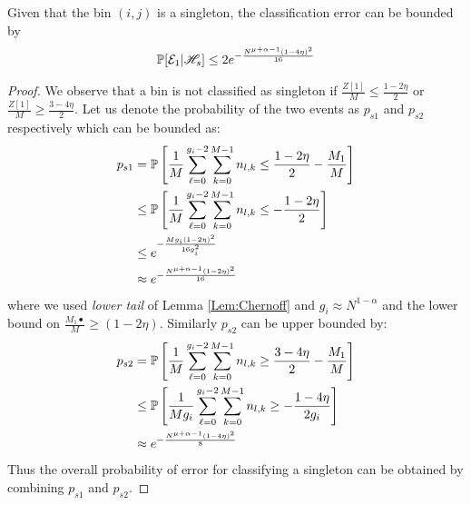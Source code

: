 \begin{lemma}[singleton]
\label{Lem:SingletonClassif}
Given that the bin $(i,j)$ is a singleton, the classification error can be bounded by
\begin{align*}
\mathbb{P}[\mathcal{E}_1|\mathscr{H}_s]\leq 2e^{-\frac{N^{\mu+\alpha-1}(1-4\eta)^2}{16}}
\end{align*}
\end{lemma}
\begin{proof}
We observe that a bin is not classified as singleton if $\frac{Z[1]}{M}\leq\frac{1-2\eta}{2}$ or $\frac{Z[1]}{M}\geq\frac{3-4\eta}{2}$. Let us denote the probability of the two events as $p_{s1}$ and $p_{s2}$ respectively which can be bounded as:
\begin{align*}
p_{s1}&=\mathbb{P}\left[\frac{1}{M}\sum\limits_{\ell=0}^{g_{i}-2}\sum\limits_{k=0}^{M-1} n_{l,k}\leq\frac{1-2\eta}{2}-\frac{M_1}{M}\right]\\
&\leq \mathbb{P}\left[\frac{1}{M}\sum\limits_{\ell=0}^{g_{i}-2}\sum\limits_{k=0}^{M-1} n_{l,k}\leq-\frac{1-2\eta}{2}\right]\\
&\leq e^{-\frac{Mg_i(1-2\eta)^2}{16g_i^{2}}}\\
&\approx e^{-\frac{N^{\mu+\alpha-1}(1-2\eta)^2}{16}}
\end{align*} 
where we used  {\it lower tail} of Lemma \ref{Lem:Chernoff} and $g_i\approx N^{1-\alpha}$ and the lower bound on $\frac{M_1•}{M}\geq (1-2\eta)$. Similarly $p_{s2}$ can be upper bounded by:
\begin{align*}
p_{s2}&=\mathbb{P}\left[\frac{1}{M}\sum\limits_{\ell=0}^{g_{i}-2}\sum\limits_{k=0}^{M-1} n_{l,k}\geq\frac{3-4\eta}{2}-\frac{M_1}{M}\right]\\
&\leq \mathbb{P}\left[\frac{1}{Mg_i}\sum\limits_{\ell=0}^{g_{i}-2}\sum\limits_{k=0}^{M-1} n_{l,k}\geq-\frac{1-4\eta}{2g_i}\right]\\
&\approx e^{-\frac{N^{\mu+\alpha-1}(1-4\eta)^2}{8}}
\end{align*} 
Thus the overall probability of error for classifying a singleton can be obtained by combining $p_{s1}$ and $p_{s2}$.
\end{proof}

